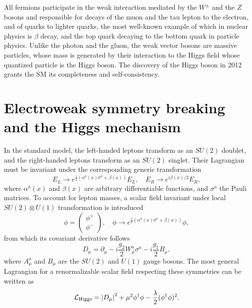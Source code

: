 All fermions participate in the weak interaction mediated by the $W^{\pm}$ and the $Z$ bosons and responsible for decays of the muon and the tau lepton to the electron, and of quarks to lighter quarks, the most well-known example of which in nuclear physics is $\beta$ decay, and the top quark decaying to the bottom quark in particle physics. 
Unlike the photon and the gluon, the weak vector bosons are massive particles, whose mass is generated by their interaction to the Higgs field whose quantized particle is the Higgs boson. 
The discovery of the Higgs boson in 2012 grants the SM its completeness and self-consistency. 

\section{Electroweak symmetry breaking and the Higgs mechanism} \label{sect:Higgs-mechanism}
In the standard model, the left-handed leptons transform as an $SU(2)$ doublet, and the right-handed leptons transform as an $SU(2)$ singlet. Their Lagrangian must be invariant under the corresponding generic transformation
\begin{equation}
    \label{eq:2.1}
    E_L \rightarrow e^{\frac{i}{2}\left( \alpha^a(x)\sigma^a + \beta(x) \right)}E_L, \quad E_R\rightarrow e^{i\beta(x)/2}E_R,
\end{equation}
where $\alpha^a(x)$ and $\beta(x)$ are arbitrary differentiable functions, and $\sigma^a$ the Pauli matrices. To account for lepton masses, a scalar field invariant under local $SU(2)\otimes U(1)$ transformation is introduced
\begin{equation}
    \label{eq:2.2}
    \phi=\begin{pmatrix}
        \phi^+ \\ \phi^-
    \end{pmatrix}, \quad \phi\rightarrow e^{\frac{i}{2}\left( \alpha^a(x)\sigma^a + \beta(x) \right)} \phi,
\end{equation}
from which its covariant derivative follows
\begin{equation}
    \label{eq:2.3}
    D_{\mu} = \partial_{\mu} - i \frac{g_2}{2}W^a_{\mu} \sigma^a - i\frac{g_1}{2}B_{\mu},
\end{equation}
where $A^{a}_{\mu}$ and $B_{\mu}$ are the $SU(2)$ and $U(1)$ gauge bosons. The most general Lagrangian for a renormalizable scalar field respecting these symmetries can be written as
\begin{equation}
    \label{eq:2.4}
    \mathcal{L}_{\mathrm{Higgs}} = \abs{D_{\mu}}^2 + \mu^2\phi^{\dagger}\phi - \frac{\lambda}{2} (\phi^{\dagger}\phi)^2.
\end{equation}
